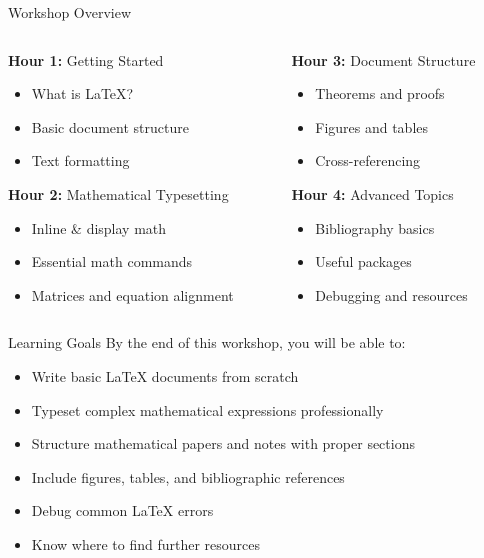 
\begin{frame}{Workshop Overview}
	\begin{columns}
		\begin{column}{0.5\textwidth}
			\textbf{Hour 1:} Getting Started
			\begin{itemize}
				\item What is LaTeX?
				\item Basic document structure
				\item Text formatting
			\end{itemize}
			
			\textbf{Hour 2:} Mathematical Typesetting
			\begin{itemize}
				\item Inline \& display math
				\item Essential math commands
				\item Matrices and equation alignment
			\end{itemize}
		\end{column}
		
		\begin{column}{0.5\textwidth}
			\textbf{Hour 3:} Document Structure
			\begin{itemize}
				\item Theorems and proofs
				\item Figures and tables
				\item Cross-referencing
			\end{itemize}
			
			\textbf{Hour 4:} Advanced Topics
			\begin{itemize}
				\item Bibliography basics
				\item Useful packages
				\item Debugging and resources
			\end{itemize}
		\end{column}
	\end{columns}
\end{frame}

\begin{frame}{Learning Goals}
	By the end of this workshop, you will be able to:
	\begin{itemize}
		\item Write basic LaTeX documents from scratch
		\item Typeset complex mathematical expressions professionally
		\item Structure mathematical papers and notes with proper sections
		\item Include figures, tables, and bibliographic references
		\item Debug common LaTeX errors
		\item Know where to find further resources
	\end{itemize}
\end{frame}

